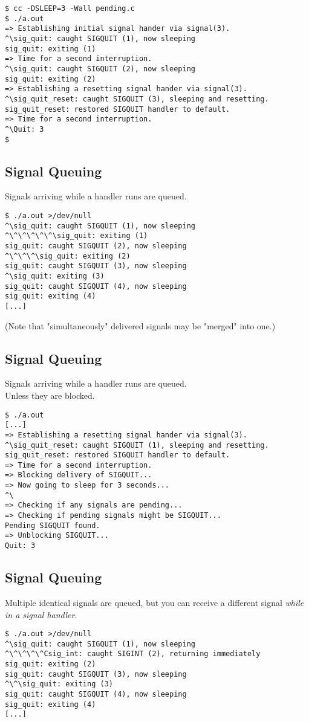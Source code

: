 \documentclass[xga]{xdvislides}
\begin{document}
\begin{verbatim}
$ cc -DSLEEP=3 -Wall pending.c
$ ./a.out
=> Establishing initial signal hander via signal(3).
^\sig_quit: caught SIGQUIT (1), now sleeping
sig_quit: exiting (1)
=> Time for a second interruption.
^\sig_quit: caught SIGQUIT (2), now sleeping
sig_quit: exiting (2)
=> Establishing a resetting signal hander via signal(3).
^\sig_quit_reset: caught SIGQUIT (3), sleeping and resetting.
sig_quit_reset: restored SIGQUIT handler to default.
=> Time for a second interruption.
^\Quit: 3
$
\end{verbatim}

\subsection{Signal Queuing}
Signals arriving while a handler runs are queued.
\begin{verbatim}
$ ./a.out >/dev/null
^\sig_quit: caught SIGQUIT (1), now sleeping
^\^\^\^\^\^\sig_quit: exiting (1)
sig_quit: caught SIGQUIT (2), now sleeping
^\^\^\^\sig_quit: exiting (2)
sig_quit: caught SIGQUIT (3), now sleeping
^\sig_quit: exiting (3)
sig_quit: caught SIGQUIT (4), now sleeping
sig_quit: exiting (4)
[...]
\end{verbatim}

(Note that "simultaneously" delivered signals may be "merged" into one.)

\subsection{Signal Queuing}
Signals arriving while a handler runs are queued. \\
Unless they are blocked.

\begin{verbatim}
$ ./a.out
[...]
=> Establishing a resetting signal hander via signal(3).
^\sig_quit_reset: caught SIGQUIT (1), sleeping and resetting.
sig_quit_reset: restored SIGQUIT handler to default.
=> Time for a second interruption.
=> Blocking delivery of SIGQUIT...
=> Now going to sleep for 3 seconds...
^\
=> Checking if any signals are pending...
=> Checking if pending signals might be SIGQUIT...
Pending SIGQUIT found.
=> Unblocking SIGQUIT...
Quit: 3
\end{verbatim}


\subsection{Signal Queuing}
Multiple identical signals are queued, but you can receive a different
signal {\em while in a signal handler}.
\begin{verbatim}
$ ./a.out >/dev/null
^\sig_quit: caught SIGQUIT (1), now sleeping
^\^\^\^\^Csig_int: caught SIGINT (2), returning immediately
sig_quit: exiting (2)
sig_quit: caught SIGQUIT (3), now sleeping
^\^\sig_quit: exiting (3)
sig_quit: caught SIGQUIT (4), now sleeping
sig_quit: exiting (4)
[...]
\end{verbatim}
\end{document}
